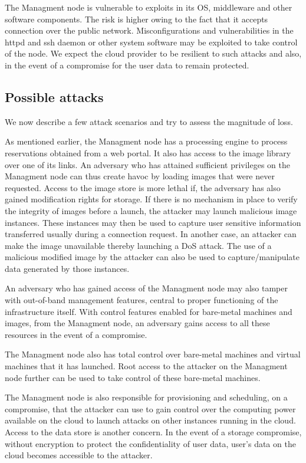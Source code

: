\documentclass[10pt,twocolumn,pdftex]{article}
\begin{document}
The Managment node is vulnerable to exploits in its OS, middleware and other software components. The risk is higher owing to the fact that it accepts connection over the public network. Misconfigurations and vulnerabilities in the httpd and ssh daemon or other system software may be exploited to take control of the node. We expect the cloud provider to be resilient to such attacks and also, in the event of a compromise for the user data to remain protected.
\subsection{Possible attacks}
We now describe a few attack scenarios and try to assess the magnitude of loss.

As mentioned earlier, the Managment node has a processing engine to process reservations obtained from a web portal. It also has access to the image library over one of its links. An adversary who has attained sufficient privileges on the Managment node can thus create havoc by loading images that were never requested. Access to the image store is more lethal if, the adversary has also gained modification rights for storage. If there is no mechanism in place to verify the integrity of images before a launch, the attacker may launch malicious image instances. These instances may then be used to capture user sensitive information transferred usually during a connection request. In another case, an attacker can make the image unavailable thereby launching a DoS attack. The use of a malicious modified image by the attacker can also be used to capture/manipulate data generated by those instances.

An adversary who has gained access of the Managment node may also tamper with out-of-band management features, central to proper functioning of the infrastructure itself. With control features enabled for bare-metal machines and images, from the Managment node, an adversary gains access to all these resources in the event of a compromise.

The Managment node also has total control over bare-metal machines and virtual machines that it has launched. Root access to the attacker on the Managment node further can be used to take control of these bare-metal machines.

The Managment node is also responsible for provisioning and scheduling, on a compromise, that the attacker can use to gain control over the computing power available on the cloud to launch attacks on other instances running in the cloud.
Access to the data store is another concern. In the event of a storage compromise, without encryption to protect the confidentiality of user data, user's data on the cloud becomes accessible to the attacker.
\end{document}
